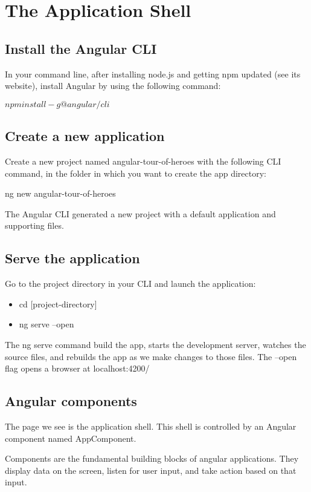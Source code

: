 \chapter{The Application Shell}
\section{Install the Angular CLI}
In your command line, after installing node.js and
getting npm updated (see its website), install
Angular by using the following command:

$npm install -g @angular/cli$

\section{Create a new application}
Create a new project named angular-tour-of-heroes with
the following CLI command, in the folder in which you
want to create the app directory:

ng new angular-tour-of-heroes

The Angular CLI generated a new project with a default
application and supporting files.

\section{Serve the application}
Go to the project directory in your CLI and launch the application:
\begin{itemize}
    \item cd [project-directory]
    \item ng serve --open
\end{itemize}

The ng serve command build the app, starts the development
server, watches the source files, and rebuilds the app as we
make changes to those files. The --open flag opens a browser
at localhost:4200/

\section{Angular components}
The page we see is the application shell. This shell is
controlled by an Angular component named AppComponent.

Components are the fundamental building blocks of angular
applications. They display data on the screen, listen for
user input, and take action based on that input.